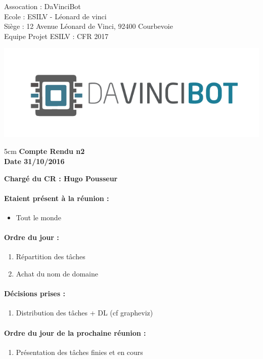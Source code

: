 \documentclass[12pt]{report}
\begin{document}
\begin{minipage}{0.55\linewidth}
\noindent Assocation : DaVinciBot\\
Ecole : ESILV - Léonard de vinci\\
Siège :  12 Avenue Léonard de Vinci, 92400 Courbevoie\\
Equipe Projet ESILV : CFR 2017\\
\end{minipage}\hfill
\begin{minipage}{0.3\linewidth}
\includegraphics[scale = 0.2]{img/logo_assos.png}
\end{minipage}
\vspace{1cm}



\begin{center}
\begin {boxedminipage} [ poslb ] { 5cm}
\textbf{Compte Rendu n2}\\
\textbf{Date 31/10/2016}
\end {boxedminipage}
\end{center}
\textbf{Chargé du CR : Hugo Pousseur}

\vspace{1cm}

\paragraph{Etaient présent à la réunion :}
\begin{itemize}
\item Tout le monde
\end{itemize}


\paragraph{Ordre du jour :}
\begin{enumerate}
 \item Répartition des tâches
 \item Achat du nom de domaine
\end{enumerate}


\paragraph{Décisions prises :}
\begin{enumerate}
 \item Distribution des tâches + DL (cf grapheviz)
\end{enumerate}


\paragraph{Ordre du jour de la prochaine réunion :}
\begin{enumerate}
 \item Présentation des tâches finies et en cours
\end{enumerate}
\end{document}
